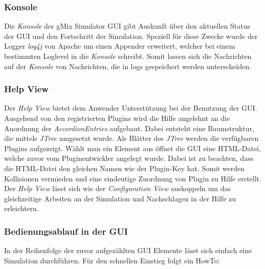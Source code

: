 \documentclass[a4paper, 11pt]{article} %
\begin{document}
\subsubsection{Konsole} %
\label{ssub:consoleview}
Die \emph{Konsole} der gMix Simulator GUI gibt Auskunft über den aktuellen Status der GUI und den Fortschritt der Simulation. Speziell für diese Zwecke wurde der Logger \emph{log4j} von Apache um einen Appender erweitert, welcher bei einem bestimmten Loglevel in die \emph{Konsole} schreibt. Somit lassen sich die Nachrichten auf der \emph{Konsole} von Nachrichten, die in logs gespeichert werden unterscheiden.

\subsubsection{Help View} %
\label{ssub:helpview}
Der \emph{Help View} bietet dem Anwender Unterstützung bei der Benutzung der GUI. Ausgehend von den registrierten Plugins wird die Hilfe angelehnt an die Anordnung der \emph{AccordionEntries} aufgebaut. Dabei entsteht eine Baumstruktur, die mittels \emph{JTree} umgesetzt wurde. Als Blätter des \emph{JTree} werden die verfügbaren Plugins aufgezeigt. Wählt man ein Element aus öffnet die GUI eine HTML-Datei, welche zuvor vom Pluginentwickler angelegt wurde. Dabei ist zu beachten, dass die HTML-Datei den gleichen Namen wie der Plugin-Key hat. Somit werden Kollisionen vermieden und eine eindeutige Zuordnung von Plugin zu Hilfe erstellt. Der \emph{Help View} lässt sich wie der \emph{Configuration View} auskoppeln um das gleichzeitige Arbeiten an der Simulation und Nachschlagen in der Hilfe zu erleichtern.

\subsubsection{Bedienungsablauf in der GUI}
\label{ssub:bedienung}
In der Reihenfolge der zuvor aufgezählten GUI Elemente lässt sich einfach eine Simulation durchführen. Für den schnellen Einstieg folgt ein HowTo:
\end{document}
